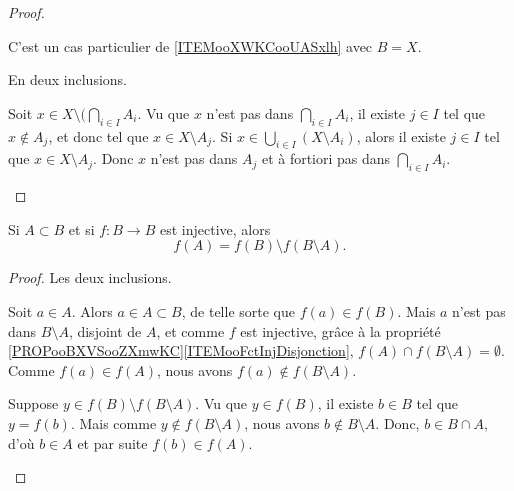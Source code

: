 \begin{proof}
\begin{subproof}
		C'est un cas particulier de \ref{ITEMooXWKCooUASxlh} avec \( B=X\).

		En deux inclusions.
		\begin{subproof}
			Soit \( x\in X\setminus(\bigcap_{i\in I}A_i\). Vu que \( x\) n'est pas dans \( \bigcap_{i\in I}A_i\), il existe \( j\in I\) tel que \( x\not\in A_j\), et donc tel que \( x\in X\setminus A_j\).
			Si \( x\in\bigcup_{i\in I}(X\setminus A_i)\), alors il existe \( j\in I\) tel que \( x\in X\setminus A_j\). Donc \( x\) n'est pas dans \( A_j\) et à fortiori pas dans \( \bigcap_{i\in I}A_i\).
		\end{subproof}
	\end{subproof}
\end{proof}

\begin{lemma}	\label{LEMooBGQRooCVLGsh}
	Si \( A\subset B\) et si \(f \colon B\to B   \) est injective, alors
	\begin{equation}		\label{EQooHLEHooADUbJO}
		f(A)=f(B)\setminus f(B\setminus A).
	\end{equation}
\end{lemma}

\begin{proof}
	Les deux inclusions.
	\begin{subproof}
		\spitem[\( \subset\)]
		Soit \( a\in A\). Alors \( a\in A\subset B\), de telle sorte que \( f(a)\in f(B)\). Mais \( a\) n'est pas dans \( B\setminus A\), disjoint de \( A \), et comme \( f\) est injective, grâce à la propriété \ref{PROPooBXVSooZXmwKC}\ref{ITEMooFctInjDisjonction}, \( f(A)\cap f(B\setminus A)=\emptyset\). Comme \( f(a)\in f(A)\), nous avons \( f(a)\notin f(B\setminus A)\).

		\spitem[Dans l'autre sens]
		Suppose \( y\in f(B)\setminus f(B\setminus A)\). Vu que \( y\in f(B)\), il existe \( b\in B\) tel que \( y=f(b)\). Mais comme \( y\notin f(B\setminus A)\), nous avons \( b\notin B\setminus A\). Donc, \( b\in B \cap A\), d'où \(b \in A \) et par suite \( f(b)\in f(A)\).
	\end{subproof}
\end{proof}

